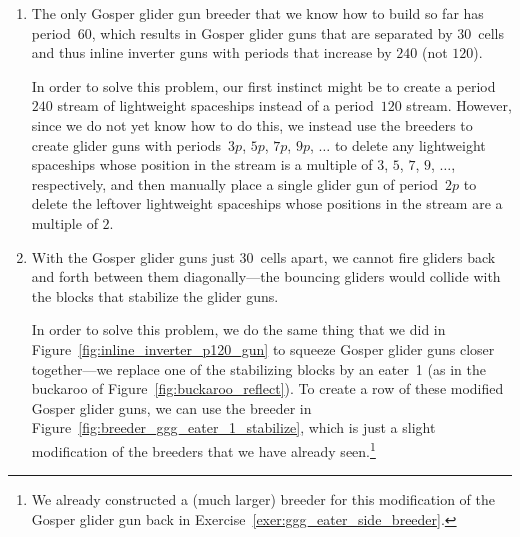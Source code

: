 \begin{enumerate}
	\item[1)] The only Gosper glider gun breeder that we know how to build so far has period~$60$, which results in Gosper glider guns that are separated by $30$~cells and thus inline inverter guns with periods that increase by $240$ (not $120$).
	
	In order to solve this problem, our first instinct might be to create a period~$240$ stream of lightweight spaceships instead of a period~$120$ stream. However, since we do not yet know how to do this, we instead use the breeders to create glider guns with periods~$3p$, $5p$, $7p$, $9p$, $\ldots$ to delete any lightweight spaceships whose position in the stream is a multiple of $3$, $5$, $7$, $9$, $\ldots$, respectively, and then manually place a single glider gun of period~$2p$ to delete the leftover lightweight spaceships whose positions in the stream are a multiple of $2$.\smallskip
	
	\item[2)] With the Gosper glider guns just $30$~cells apart, we cannot fire gliders back and forth between them diagonally---the bouncing gliders would collide with the blocks that stabilize the glider guns.
	
	In order to solve this problem, we do the same thing that we did in Figure~\ref{fig:inline_inverter_p120_gun} to squeeze Gosper glider guns closer together---we replace one of the stabilizing blocks by an eater~1 (as in the buckaroo of Figure~\ref{fig:buckaroo_reflect}). To create a row of these modified Gosper glider guns, we can use the breeder in Figure~\ref{fig:breeder_ggg_eater_1_stabilize}, which is just a slight modification of the breeders that we have already seen.\footnote{We already constructed a (much larger) breeder for this modification of the Gosper glider gun back in Exercise~\ref{exer:ggg_eater_side_breeder}.}\bigskip
	
	\noindent\begin{minipage}{\linewidth}
		\centering
		\label{fig:breeder_ggg_eater_1_stabilize}\bigskip
	\end{minipage}
	

\end{enumerate}

